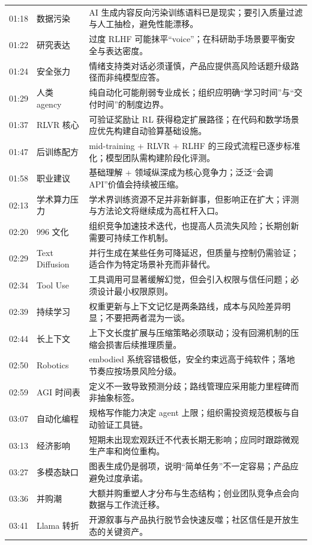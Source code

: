 \begin{longtable}{p{}p{}p{}}
01:18 & 数据污染 & AI 生成内容反向污染训练语料已是现实；要引入质量过滤与人工抽检，避免性能漂移。 \\
01:22 & 研究表达 & 过度 RLHF 可能抹平“voice”；在科研助手场景要平衡安全与表达密度。 \\
01:24 & 安全张力 & 情绪支持类对话必须谨慎，产品应提供高风险话题升级路径而非纯模型应答。 \\
01:29 & 人类 agency & 纯自动化可能削弱专业成长；组织应明确“学习时间”与“交付时间”的制度边界。 \\
01:37 & RLVR 核心 & 可验证奖励让 RL 获得稳定扩展路径；在代码和数学场景应优先构建自动验算基础设施。 \\
01:47 & 后训练配方 & mid-training + RLVR + RLHF 的三段式流程已逐步标准化；模型团队需构建阶段化评测。 \\
01:58 & 职业建议 & 基础理解 + 领域纵深成为核心竞争力；泛泛“会调 API”价值会持续被压缩。 \\
02:13 & 学术算力压力 & 学术界训练资源不足并非新鲜事，但影响正在扩大；评测与方法论文将继续成为高杠杆入口。 \\
02:20 & 996 文化 & 组织竞争加速技术迭代，也提高人员流失风险；长期创新需要可持续工作机制。 \\
02:29 & Text Diffusion & 并行生成在某些任务可降延迟，但质量与控制仍需验证；适合作为特定场景补充而非替代。 \\
02:34 & Tool Use & 工具调用可显著缓解幻觉，但会引入权限与信任问题；必须设计最小权限原则。 \\
02:39 & 持续学习 & 权重更新与上下文记忆是两条路线，成本与风险差异明显；不要把两者混为一谈。 \\
02:44 & 长上下文 & 上下文长度扩展与压缩策略必须联动；没有回溯机制的压缩会损害后续推理质量。 \\
02:50 & Robotics & embodied 系统容错极低，安全约束远高于纯软件；落地节奏应按场景风险分级。 \\
02:59 & AGI 时间表 & 定义不一致导致预测分歧；路线管理应采用能力里程碑而非抽象标签。 \\
03:07 & 自动化编程 & 规格写作能力决定 agent 上限；组织需投资规范模板与自动验证工具链。 \\
03:13 & 经济影响 & 短期未出现宏观跃迁不代表长期无影响；应同时跟踪微观生产率和岗位重构。 \\
03:27 & 多模态缺口 & 图表生成仍是弱项，说明“简单任务”不一定容易；产品应避免过度承诺。 \\
03:36 & 并购潮 & 大额并购重塑人才分布与生态结构；创业团队竞争点会向数据与工作流迁移。 \\
03:41 & Llama 转折 & 开源叙事与产品执行脱节会快速反噬；社区信任是开放生态的关键资产。 \\

\end{longtable}
